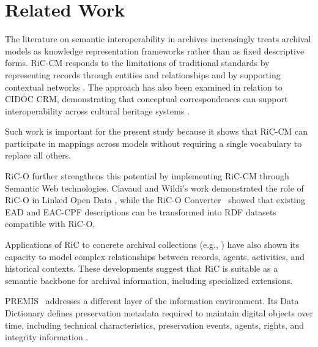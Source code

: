 \documentclass[runningheads]{llncs}
\begin{document}
	
	\section{Related Work}
	\label{sec:related-work}
	
	The literature on semantic interoperability in archives increasingly treats archival models as knowledge representation frameworks rather than as fixed descriptive forms. RiC-CM responds to the limitations of traditional standards by representing records through entities and relationships and by supporting contextual networks \cite{gueguen2013toward,dancy2024waiting}.
	The approach has also been examined in relation to CIDOC CRM, demonstrating that conceptual correspondences can support interoperability across cultural heritage systems \cite{bountouri2023semantic,cardoso2024knowledge}.
	
	Such work is important for the present study because it shows that RiC-CM can participate in mappings across models without requiring a single vocabulary to replace all others.
	
	RiC-O further strengthens this potential by implementing RiC-CM through Semantic Web technologies. Clavaud and Wildi's work demonstrated the role of RiC-O in Linked Open Data \cite{clavaud2021ica}, while the RiC-O Converter~\cite{clavaud2023ric} showed that existing EAD and EAC-CPF descriptions can be transformed into RDF datasets compatible with RiC-O.
	
	Applications of RiC to concrete archival collections (e.g., \cite{dimitriou2025describing}) have also shown its capacity to model complex relationships between records, agents, activities, and historical contexts. These developments suggest that RiC is suitable as a semantic backbone for archival information, including specialized extensions.
	
	PREMIS~\cite{premis_data_dictionary_2015,donaldson2010implementing,di2016premis,woodyard2007implementing,coppens2015premis} addresses a different layer of the information environment. Its Data Dictionary defines preservation metadata required to maintain digital objects over time, including technical characteristics, preservation events, agents, rights, and integrity information \cite{premis_data_dictionary_2015}.
	
\end{document}
